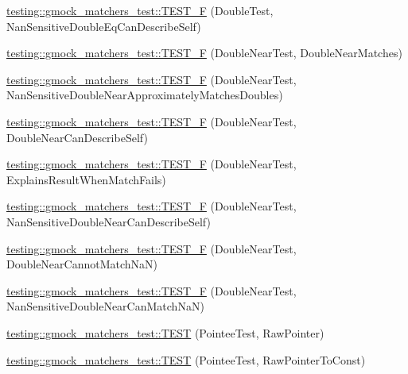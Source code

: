 \begin{DoxyCompactItemize}
\item 
\mbox{\hyperlink{namespacetesting_1_1gmock__matchers__test_a2d101d1823617f9b1346ee64cdce5216}{testing\+::gmock\+\_\+matchers\+\_\+test\+::\+T\+E\+S\+T\+\_\+F}} (Double\+Test, Nan\+Sensitive\+Double\+Eq\+Can\+Describe\+Self)
\item 
\mbox{\hyperlink{namespacetesting_1_1gmock__matchers__test_ab2949593472038919b8f3e1b2da204bc}{testing\+::gmock\+\_\+matchers\+\_\+test\+::\+T\+E\+S\+T\+\_\+F}} (Double\+Near\+Test, Double\+Near\+Matches)
\item 
\mbox{\hyperlink{namespacetesting_1_1gmock__matchers__test_add8765ad2bb98f4b064ee77b4c21a612}{testing\+::gmock\+\_\+matchers\+\_\+test\+::\+T\+E\+S\+T\+\_\+F}} (Double\+Near\+Test, Nan\+Sensitive\+Double\+Near\+Approximately\+Matches\+Doubles)
\item 
\mbox{\hyperlink{namespacetesting_1_1gmock__matchers__test_a31d14a68cacbaab3fafd26247cc11f9c}{testing\+::gmock\+\_\+matchers\+\_\+test\+::\+T\+E\+S\+T\+\_\+F}} (Double\+Near\+Test, Double\+Near\+Can\+Describe\+Self)
\item 
\mbox{\hyperlink{namespacetesting_1_1gmock__matchers__test_a4250d3de38128f3452a0a9e93173bdb4}{testing\+::gmock\+\_\+matchers\+\_\+test\+::\+T\+E\+S\+T\+\_\+F}} (Double\+Near\+Test, Explains\+Result\+When\+Match\+Fails)
\item 
\mbox{\hyperlink{namespacetesting_1_1gmock__matchers__test_ad147bef4b26c0a060cb4d25fe517a3e3}{testing\+::gmock\+\_\+matchers\+\_\+test\+::\+T\+E\+S\+T\+\_\+F}} (Double\+Near\+Test, Nan\+Sensitive\+Double\+Near\+Can\+Describe\+Self)
\item 
\mbox{\hyperlink{namespacetesting_1_1gmock__matchers__test_a9542b930e1de4d087a8655855edcc13c}{testing\+::gmock\+\_\+matchers\+\_\+test\+::\+T\+E\+S\+T\+\_\+F}} (Double\+Near\+Test, Double\+Near\+Cannot\+Match\+NaN)
\item 
\mbox{\hyperlink{namespacetesting_1_1gmock__matchers__test_a7c8d850697cb6cc030a4b05eeecffb72}{testing\+::gmock\+\_\+matchers\+\_\+test\+::\+T\+E\+S\+T\+\_\+F}} (Double\+Near\+Test, Nan\+Sensitive\+Double\+Near\+Can\+Match\+NaN)
\item 
\mbox{\hyperlink{namespacetesting_1_1gmock__matchers__test_ad6a13303d164fa9ca035a137840b78cb}{testing\+::gmock\+\_\+matchers\+\_\+test\+::\+T\+E\+ST}} (Pointee\+Test, Raw\+Pointer)
\item 
\mbox{\hyperlink{namespacetesting_1_1gmock__matchers__test_a84a21ee7de697401049cb932f859ee33}{testing\+::gmock\+\_\+matchers\+\_\+test\+::\+T\+E\+ST}} (Pointee\+Test, Raw\+Pointer\+To\+Const)

\end{DoxyCompactItemize}
